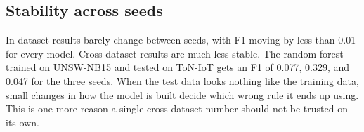 \begin{table}[t]
\centering
\small
\setlength{\tabcolsep}{4pt}
\caption{Attack-class F1 with and without the two TTL features. UNSW in is trained and tested on UNSW-NB15. UNSW out is trained on UNSW-NB15 and averaged over the other two test sets. All cross averages all six cross-dataset pairs.}
\label{tab:ablation}
\end{table}

\ABLATIONPARA

\subsection{Stability across seeds}

In-dataset results barely change between seeds, with F1 moving by less than 0.01 for every model. Cross-dataset results are much less stable. The random forest trained on UNSW-NB15 and tested on ToN-IoT gets an F1 of 0.077, 0.329, and 0.047 for the three seeds. When the test data looks nothing like the training data, small changes in how the model is built decide which wrong rule it ends up using. This is one more reason a single cross-dataset number should not be trusted on its own.
